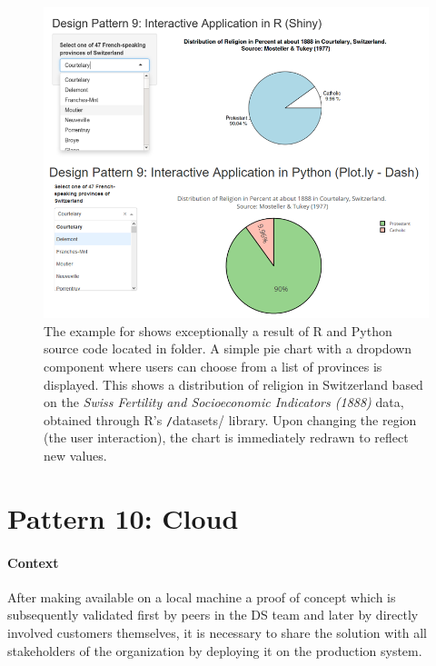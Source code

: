 \begin{figure}[ht]
\centering
\includegraphics[width=\textwidth,height=\textheight,keepaspectratio]{images_dp/code_listing_9_intApp}
\caption[Example for Interactive Application Design Pattern.]{The example for  shows exceptionally a result of R and Python source code located in  folder. 
A simple pie chart with a dropdown component where users can choose from a list of provinces is displayed. 
This shows a distribution of religion in Switzerland based on the \emph{Swiss Fertility and Socioeconomic Indicators (1888)} data, obtained through R's \texttt/datasets/ library.
Upon changing the region (the user interaction), the chart is immediately redrawn to reflect new values.}
\label{lst:code_pattern10}
\end{figure}

\section{Pattern 10: Cloud}

\paragraph*{Context}
After making available on a local machine a proof of concept which is subsequently validated first by peers in the \ac{DS} team and later by directly involved customers themselves, it is necessary to share the solution with all stakeholders of the organization by deploying it on the production system.

